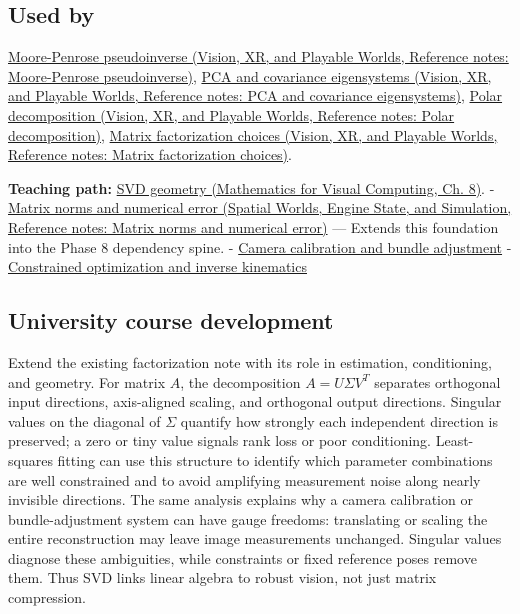 \subsection{Used by}\label{appendix-1fad5e7f36fa-used-by}

\href{../07-Vision-XR-and-Playable-Worlds/main.pdf\#nameddest=appendix-541306fdbc1b}{Moore-Penrose pseudoinverse (Vision, XR, and Playable Worlds, Reference notes: Moore-Penrose pseudoinverse)}, \href{../07-Vision-XR-and-Playable-Worlds/main.pdf\#nameddest=appendix-ad175ef3c5bf}{PCA and covariance eigensystems (Vision, XR, and Playable Worlds, Reference notes: PCA and covariance eigensystems)}, \href{../07-Vision-XR-and-Playable-Worlds/main.pdf\#nameddest=appendix-73f5bcf7a462}{Polar decomposition (Vision, XR, and Playable Worlds, Reference notes: Polar decomposition)}, \href{../07-Vision-XR-and-Playable-Worlds/main.pdf\#nameddest=appendix-221a483bec2d}{Matrix factorization choices (Vision, XR, and Playable Worlds, Reference notes: Matrix factorization choices)}.

\textbf{Teaching path:} \href{../02-Mathematics-for-Visual-Computing/main.pdf\#nameddest=02-foundations-ii-ch024-singular-value-decomposition-covers-every-rectangular-map}{SVD geometry (Mathematics for Visual Computing, Ch. 8)}. - \href{../05-Spatial-Worlds-Engine-State-and-Simulation/main.pdf\#nameddest=appendix-f8657bac66e5}{Matrix norms and numerical error (Spatial Worlds, Engine State, and Simulation, Reference notes: Matrix norms and numerical error)} --- Extends this foundation into the Phase 8 dependency spine. - \hyperref[appendix-3ee9861904d5]{Camera calibration and bundle adjustment} - \hyperref[appendix-29f4bea4c2bb]{Constrained optimization and inverse kinematics}

\subsection{University course development}\label{appendix-1fad5e7f36fa-university-course-development}

Extend the existing factorization note with its role in estimation, conditioning, and geometry. For matrix \(A\), the decomposition \(A=U\Sigma V^T\) separates orthogonal input directions, axis-aligned scaling, and orthogonal output directions. Singular values on the diagonal of \(\Sigma\) quantify how strongly each independent direction is preserved; a zero or tiny value signals rank loss or poor conditioning. Least-squares fitting can use this structure to identify which parameter combinations are well constrained and to avoid amplifying measurement noise along nearly invisible directions. The same analysis explains why a camera calibration or bundle-adjustment system can have gauge freedoms: translating or scaling the entire reconstruction may leave image measurements unchanged. Singular values diagnose these ambiguities, while constraints or fixed reference poses remove them. Thus SVD links linear algebra to robust vision, not just matrix compression.

